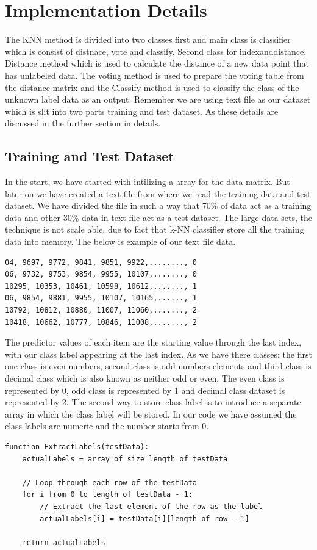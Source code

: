 \documentclass[conference]{IEEEtran}
\begin{document}
\section{Implementation Details}
The KNN method is divided into two classes first and main class is classifier which is consist of distnace, vote and classify. Second class for indexanddistance. Distance method which is used to calculate the distance of a new data point that has unlabeled data. The voting method is used to prepare the voting table from the distance matrix and the Classify method is used to classify the class of the unknown label data as an output. Remember we are using text file as our dataset which is slit into two parts training and test dataset. As these details are discussed in the further section in details. 


\subsection{Training and Test Dataset}
In the start, we have started with intilizing a array for the data matrix. But later-on we have created a text file from where we read the training data and test dataset. We have divided the file in such a way that 70\% of data act as a training data and other 30\% data in text file act as a test dataset. The large data sets, the technique is not scale able, due to fact that k-NN classifier store all the training data into memory. The below is example of our text file data. 
\begin{lstlisting}
04, 9697, 9772, 9841, 9851, 9922,........, 0
06, 9732, 9753, 9854, 9955, 10107,......., 0
10295, 10353, 10461, 10598, 10612,......., 1
06, 9854, 9881, 9955, 10107, 10165,......, 1
10792, 10812, 10880, 11007, 11060,......., 2
10418, 10662, 10777, 10846, 11008,......., 2
\end{lstlisting}
The predictor values of each item are the starting value through the last index, with our class label appearing at the last index. As we have there classes: the first one class is even numbers, second class is odd numbers elements and third class is decimal class which is also known as neither odd or even. The even class is represented by 0, odd class is represented by 1 and decimal class dataset is represented by 2. The second way to store class label is to introduce a separate array in which the class label will be stored. In our code we have assumed the class labels are numeric and the number starts from 0. 
\begin{lstlisting}
function ExtractLabels(testData):
    actualLabels = array of size length of testData
    
    // Loop through each row of the testData
    for i from 0 to length of testData - 1:
        // Extract the last element of the row as the label
        actualLabels[i] = testData[i][length of row - 1]
    
    return actualLabels
\end{lstlisting}
\end{document}
